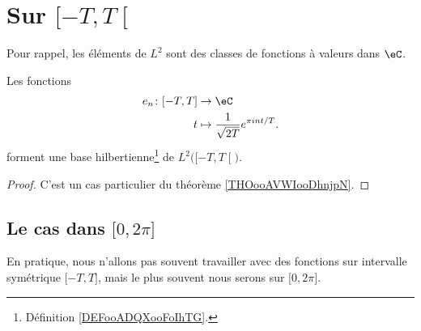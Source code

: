 
\section{Sur \( \mathopen[ -T , T \mathclose[\)}

	Pour rappel, les éléments de \( L^2\) sont des classes de fonctions à valeurs dans \( \eC\).

	\begin{proposition}     \label{PROPooHNJZooGfRCfU}
		Les fonctions
		\begin{equation}
			\begin{aligned}
				e_n\colon \mathopen[ -T , T \mathclose] & \to \eC                                        \\
				t                                       & \mapsto \frac{1}{ \sqrt{ 2T } } e^{\pi int/T}.
			\end{aligned}
		\end{equation}
		forment une base hilbertienne\footnote{Définition \ref{DEFooADQXooFoIhTG}.} de \( L^2\big( \mathopen[ -T , T \mathclose[ \big)\).
	\end{proposition}

	\begin{proof}
		C'est un cas particulier du théorème \ref{THOooAVWIooDhnjpN}.
	\end{proof}

	\subsection{Le cas dans \( \mathopen[ 0 , 2\pi \mathclose]\)}

	En pratique, nous n'allons pas souvent travailler avec des fonctions sur intervalle symétrique \( \mathopen[ -T , T \mathclose]\), mais le plus souvent nous serons sur \( \mathopen[ 0 , 2\pi \mathclose]\).

